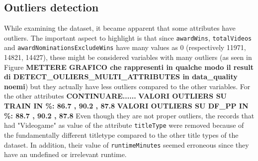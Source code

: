 \subsection{Outliers detection}
While examining the dataset, it became apparent that some attributes have outliers. 
The important aspect to highlight is that since \texttt{awardWins}, \texttt{totalVideos} 
and \texttt{awardNominationsExcludeWins} have many values as 0 (respectively 11971, 14821, 14427), 
these might be considered variables with many outliers 
(as seen in Figure \textbf{METTERE GRAFICO che rappresenti in qualche modo il result di DETECT\_OULIERS\_MULTI\_ATTRIBUTES in data\_quality noemi}) 
but they actually have less outliers compared to the other variables.
For the other attributes \textbf{CONTINUARE......}
\textbf{VALORI OUTLIERS SU TRAIN IN \%: 86.7 , 90.2 , 87.8}
\textbf{VALORI OUTLIERS SU DF\_PP IN \%: 88.7 , 90.2 , 87.8}
Even though they are not proper outliers, the records that had "Videogame" as value of the attribute \texttt{titleType} were removed 
because of the fundamentally different titletype compared to the other title types of the dataset. In addition, their value of \texttt{runtimeMinutes}
seemed erroneous since they have an undefined or irrelevant runtime.


